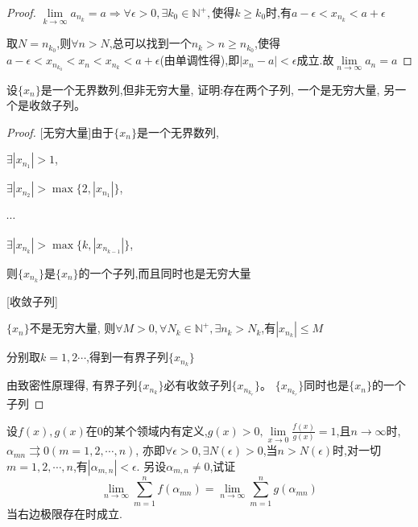 \begin{proof}
    $\lim \limits_{k \to \infty} a_{n_k}=a \Longrightarrow \forall \epsilon>0,\exists k_0 \in \mathbb{N}^+,\mbox{使得}k\ge k_0\mbox{时,有}a-\epsilon<x_{n_k}<a+\epsilon$

    取$N=n_{k_0}$,则$\forall n>N$,总可以找到一个$n_k>n\ge n_{k_0}$,使得$a-\epsilon<x_{n_{k_0}}<x_n<x_{n_k}<a+\epsilon$(由单调性得),即$|x_n-a|<\epsilon$成立.故$\lim \limits_{n \to \infty} a_n=a$
\end{proof}

\begin{exercise}
    设$\{x_n\}$是一个无界数列,但非无穷大量, 证明:存在两个子列, 一个是无穷大量, 另一个是收敛子列。
\end{exercise}

\begin{proof}
    
    [无穷大量]由于$\{x_n\}$是一个无界数列,

    $\exists |x_{n_1}|>1$,

    $\exists |x_{n_2}|>\max \{2,|x_{n_1}|\}$,

    $\cdots$

    $\exists |x_{n_k}|>\max \{k,|x_{n_{k-1}}|\}$,

    则$\{x_{n_k}\}$是$\{x_n\}$的一个子列,而且同时也是无穷大量

    [收敛子列]

    $\{x_n\}$不是无穷大量, 则$\forall M>0,\forall N_k\in \mathbb{N}^+,\exists n_k>N_k$,有$|x_{n_k}|\le M$

    分别取$k=1,2\cdots$,得到一有界子列$\{x_{n_k}\}$

    由致密性原理得, 有界子列$\{x_{n_k}\}$必有收敛子列$\{x_{n_{k_r}}\}$。 $\{x_{n_{k_r}}\}$同时也是$\{x_n\}$的一个子列
\end{proof}

\begin{exercise}\label{练习1.2.11}
    设$f(x),g(x)$在0的某个领域内有定义,$g(x)>0,\lim \limits_{x \to 0} \frac{f(x)}{g(x)}=1$,且$n\to \infty$时,$\alpha_{mn} \rightrightarrows 0(m=1,2,\cdots,n)$, 亦即$\forall \epsilon>0,\exists N(\epsilon)>0$,当$n>N(\epsilon)$时,对一切$m=1,2,\cdots,n$,有$|\alpha_{m,n}|<\epsilon$. 另设$\alpha_{m,n}\ne 0$,试证$$\lim \limits_{n \to \infty} \sum\limits_{m=1}^{n} f(\alpha_{mn})=\lim \limits_{n \to \infty} \sum\limits_{m=1}^{n} g(\alpha_{mn})$$ 
    当右边极限存在时成立. 
\end{exercise}

